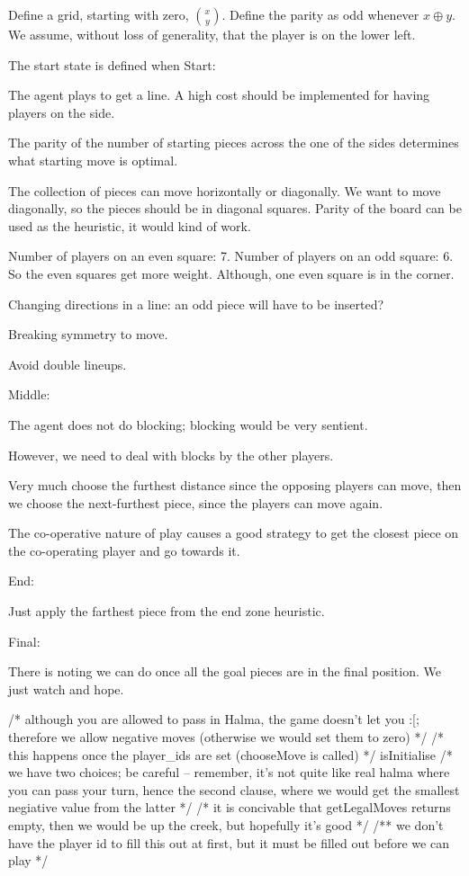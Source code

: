 \documentclass[twocolumn]{article}
\def\xor{\oplus} %
\begin{document}
Define a grid, starting with zero, $\binom{x}{y}$. Define the parity as odd whenever $x \xor y$. We assume, without loss of generality, that the player is on the lower left.

The start state is defined when 
Start:

The agent plays to get a line. A high cost should be implemented for having players on the side.

The parity of the number of starting pieces across the one of the sides determines what starting move is optimal.

The collection of pieces can move horizontally or diagonally. We want to move diagonally, so the pieces should be in diagonal squares. Parity of the board can be used as the heuristic, it would kind of work.


Number of players on an even square: 7. Number of players on an odd square: 6. So the even squares get more weight. Although, one even square is in the corner.

Changing directions in a line: an odd piece will have to be inserted?

Breaking symmetry to move.

Avoid double lineups.


Middle:

The agent does not do blocking; blocking would be very sentient.

However, we need to deal with blocks by the other players.

Very much choose the furthest distance since the opposing players can move, then we choose the next-furthest piece, since the players can move again.

The co-operative nature of play causes a good strategy to get the closest piece on the co-operating player and go towards it.

End:

Just apply the farthest piece from the end zone heuristic.

Final:

There is noting we can do once all the goal pieces are in the final position. We just watch and hope.

		/* although you are allowed to pass in Halma, the game doesn't let
		 you :[; therefore we allow negative moves
		 (otherwise we would set them to zero) */
		/* this happens once the player_ids are set (chooseMove is called) */
isInitialise
		/* we have two choices; be careful -- remember, it's not quite like real
		 halma where you can pass your turn, hence the second clause, where
		 we would get the smallest negiative value from the latter */
			/* it is concivable that getLegalMoves returns empty, then we would be
			 up the creek, but hopefully it's good */
	/** we don't have the player id to fill this out at first, but it must be
	 filled out before we can play */
\end{document}
